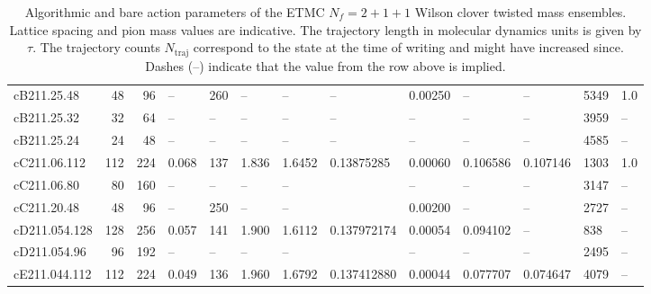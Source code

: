 \documentclass[a4paper,11pt]{article}
\begin{document}
\begin{table}
{\begin{tabular}{lrrllllllllll}
      cB211.25.48   & 48    & 96    & --            & 260   & --      & --     & --          & 0.00250    & --           & --      & 5349 & 1.0 \\
      cB211.25.32   & 32    & 64    & --            & --    & --      & --     & --          & --         & --           & --      & 3959 & -- \\
      cB211.25.24   & 24    & 48    & --            & --    & --      & --     & --          & --         & --           & --      & 4585 & -- \\ \hline 
      cC211.06.112  & 112   & 224   & 0.068         & 137   & 1.836   & 1.6452 & 0.13875285  & 0.00060    & 0.106586     & 0.107146 & 1303 & 1.0 \\
      cC211.06.80   & 80    & 160   & --            & --    & --      & --     &             & --         & --           & --      & 3147 & -- \\
      cC211.20.48   & 48    & 96    & --            & 250   & --      & --     &             & 0.00200    & --           & --      & 2727 & -- \\ \hline
      cD211.054.128 & 128   & 256   & 0.057         & 141   & 1.900   & 1.6112 & 0.137972174 & 0.00054    & 0.094102     & --      & 838 & -- \\
      cD211.054.96  & 96    & 192   & --            & --    & --      & --     &             & --         & --           & --      & 2495 & -- \\ \hline
      cE211.044.112 & 112   & 224   & 0.049         & 136   & 1.960   & 1.6792 & 0.137412880 & 0.00044    & 0.077707     & 0.074647 & 4079 & -- \\ \hline
    \end{tabular}%
  }
  \caption{Algorithmic and bare action parameters of the ETMC $N_f=2+1+1$ Wilson clover twisted mass ensembles. Lattice spacing and pion mass values are indicative. The trajectory length in molecular dynamics units is given by $\tau$. The trajectory counts $N_\textrm{traj}$ correspond to the state at the time of writing and might have increased since. Dashes (--) indicate that the value from the row above is implied.}
\end{table}
\end{document}

